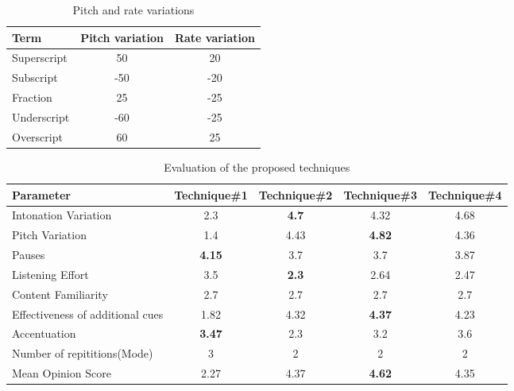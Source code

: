 \documentclass{article}
\begin{document}
\begin{table}[t]
\caption{Pitch and rate variations}

\vspace{8pt} %

\centering
\begin{tabular}{|l | c | c | }
\hline%
Term & Pitch variation & Rate variation \\[0.5ex]
\hline
Superscript & 50 & 20  \\
Subscript & -50 & -20  \\
Fraction & 25 & -25  \\
Underscript & -60 & -25  \\
Overscript & 60 & 25\\ %
\hline


\end{tabular}
\label{table:pitchandrate}
\end{table}



\begin{table}[t]
\centering
\caption{Evaluation of the proposed techniques}

\vspace{8pt} %

\begin{tabularx}{\textwidth}{|l |c |c |c |c|}
\hline%
Parameter   & Technique\#1 & Technique\#2 & Technique\#3 & Technique\#4 \\[0.5ex]
\hline
Intonation Variation  & 2.3 & \textbf{4.7} & 4.32 & 4.68 \\
\hline
Pitch  Variation & 1.4 & 4.43 & \textbf{4.82} & 4.36\\
\hline
Pauses  & \textbf{4.15} & 3.7 & 3.7 & 3.87 \\
\hline
Listening Effort  & 3.5 & \textbf{2.3} & 2.64 & 2.47\\
\hline
Content Familiarity  &2.7 &2.7 &2.7 &2.7\\
\hline
Effectiveness of additional cues  &1.82 & 4.32 & \textbf{4.37} & 4.23\\
\hline
Accentuation &\textbf{3.47} & 2.3 & 3.2 & 3.6 \\
\hline
Number of repititions(Mode) & 3 & 2 & 2 & 2\\
\hline
Mean Opinion Score  & 2.27 & 4.37 & \textbf{4.62} & 4.35\\ %
\hline


\end{tabularx}
\label{table:eval}
\end{table}
\end{document}
